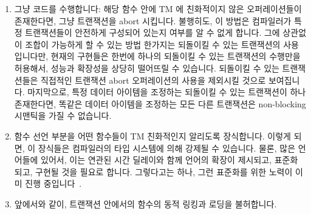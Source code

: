 \begin{enumerate}
\item	그냥 코드를 수행합니다: 해당 함수 안에 TM 에 친화적이지 않은
	오퍼레이션들이 존재한다면, 그냥 트랜잭션을 abort 시킵니다.
	불행히도, 이 방법은 컴파일러가 특정 트랜잭션들이 안전하게 구성되어
	있는지 여부를 알 수 없게 합니다.
	그에 상관없이 조합이 가능하게 할 수 있는 방법 한가지는 되돌이킬 수 있는
	트랜잭션의 사용입니다만, 현재의 구현들은 한번에 하나의 되돌이킬 수 있는
	트랜잭션의 수행만을 허용해서, 성능과 확장성을 상당히 떨어뜨릴 수
	있습니다.
	되돌이킬 수 있는 트랜잭션들은 직접적인 트랜잭션 abort 오퍼레이션의
	사용을 제외시킬 것으로 보여집니다.
	마지막으로, 특정 데이터 아이템을 조정하는 되돌이킬 수 있는 트랜잭션이
	하나 존재한다면, 똑같은 데이터 아이템을 조정하는 모든 다른 트랜잭션은
	non-blocking 시맨틱을 가질 수 없습니다.

\item	함수 선언 부분을 어떤 함수들이 TM 친화적인지 알리도록 장식합니다.
	이렇게 되면, 이 장식들은 컴파일러의 타입 시스템에 의해 강제될 수
	있습니다.
	물론, 많은 언어들에 있어서, 이는 연관된 시간 딜레이와 함께 언어의
	확장이 제시되고, 표준화 되고, 구현될 것을 필요로 합니다.
	그렇다고는 하나, 그런 표준화를 위한 노력이 이미 진행
	중입니다~\cite{Ali-Reza-Adl-Tabatabai2009CppTM}.
\item	앞에서와 같이, 트랜잭션 안에서의 함수의 동적 링킹과 로딩을 불허합니다.

\end{enumerate}

